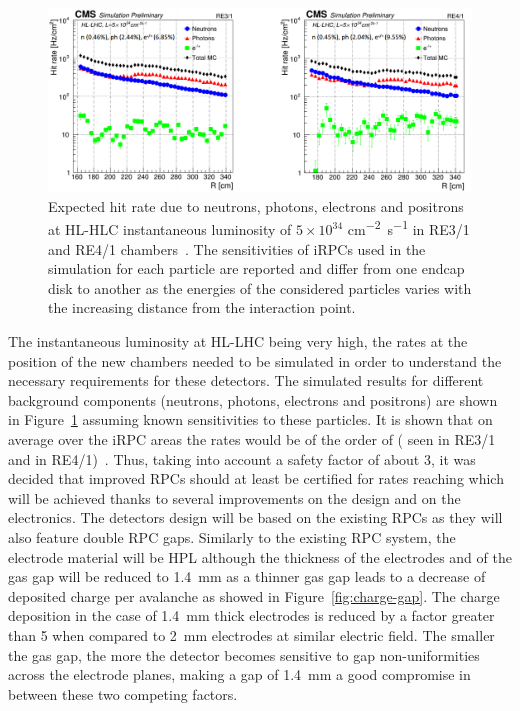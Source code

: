 	\begin{figure}[H]
		\centering
		\includegraphics[width=\textwidth]{fig/chapt3/RPC-Sim-HL-LHC_Rate.png}
		\caption{\label{fig:iRPC-Rate} Expected hit rate due to neutrons, photons, electrons and positrons at HL-HLC instantaneous luminosity of $5\times10^{34}$ \si{cm^{-2}s^{-1}} in RE3/1 and RE4/1 chambers~\cite{ANDREA2018,ANDREA2018PROC}. The sensitivities of iRPCs used in the simulation for each particle are reported and differ from one endcap disk to another as the energies of the considered particles varies with the increasing distance from the interaction point.}
	\end{figure}
	
	The instantaneous luminosity at HL-LHC being very high, the rates at the position of the new chambers needed to be simulated in order to understand the necessary requirements for these detectors. The simulated results for different background components (neutrons, photons, electrons and positrons) are shown in Figure~\ref{fig:iRPC-Rate} assuming known sensitivities to these particles. It is shown that on average over the iRPC areas the rates would be of the order of  ( seen in RE3/1 and  in RE4/1)~\cite{ANDREA2018,ANDREA2018PROC}. Thus, taking into account a safety factor of about 3, it was decided that improved RPCs should at least be certified for rates reaching  which will be achieved thanks to several improvements on the design and on the electronics. The detectors design will be based on the existing RPCs as they will also feature double RPC gaps. Similarly to the existing RPC system, the electrode material will be HPL although the thickness of the electrodes and of the gas gap will be reduced to \SI{1.4}{mm} as a thinner gas gap leads to a decrease of deposited charge per avalanche as showed in Figure~\ref{fig:charge-gap}. The charge deposition in the case of \SI{1.4}{mm} thick electrodes is reduced by a factor greater than 5 when compared to \SI{2}{mm} electrodes at similar electric field. The smaller the gas gap, the more the detector becomes sensitive to gap non-uniformities across the electrode planes, making a gap of \SI{1.4}{mm} a good compromise in between these two competing factors.

